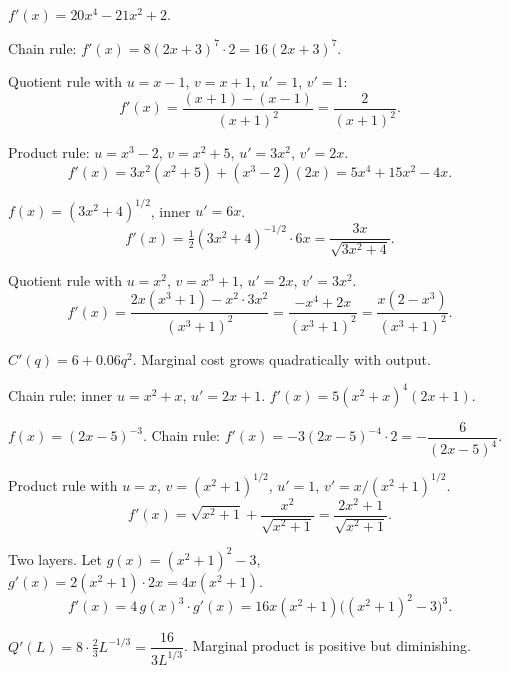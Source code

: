 \begin{solutions}
  \item $f'(x)=20x^{4}-21x^{2}+2$.

  \item Chain rule: $f'(x)=8(2x+3)^{7}\cdot 2=16(2x+3)^{7}$.

  \item Quotient rule with $u=x-1$, $v=x+1$, $u'=1$, $v'=1$:
        \[
          f'(x)=\frac{(x+1)-(x-1)}{(x+1)^{2}}=\frac{2}{(x+1)^{2}} .
        \]

  \item Product rule: $u=x^{3}-2$, $v=x^{2}+5$, $u'=3x^{2}$, $v'=2x$.
        \[
          f'(x)=3x^{2}(x^{2}+5)+(x^{3}-2)(2x)=5x^{4}+15x^{2}-4x .
        \]

  \item $f(x)=(3x^{2}+4)^{1/2}$, inner $u'=6x$.
        \[
          f'(x)=\tfrac12(3x^{2}+4)^{-1/2}\cdot 6x=\frac{3x}{\sqrt{3x^{2}+4}} .
        \]

  \item Quotient rule with $u=x^{2}$, $v=x^{3}+1$, $u'=2x$, $v'=3x^{2}$.
        \[
          f'(x)=\frac{2x(x^{3}+1)-x^{2}\cdot 3x^{2}}{(x^{3}+1)^{2}}
               =\frac{-x^{4}+2x}{(x^{3}+1)^{2}}
               =\frac{x(2-x^{3})}{(x^{3}+1)^{2}} .
        \]

  \item $C'(q)=6+0.06q^{2}$. Marginal cost grows quadratically with output.

  \item Chain rule: inner $u=x^{2}+x$, $u'=2x+1$.
        $f'(x)=5(x^{2}+x)^{4}(2x+1)$.

  \item $f(x)=(2x-5)^{-3}$. Chain rule: $f'(x)=-3(2x-5)^{-4}\cdot 2
        =-\dfrac{6}{(2x-5)^{4}}$.

  \item Product rule with $u=x$, $v=(x^{2}+1)^{1/2}$, $u'=1$,
        $v'=x/(x^{2}+1)^{1/2}$.
        \[
          f'(x)=\sqrt{x^{2}+1}+\frac{x^{2}}{\sqrt{x^{2}+1}}
               =\frac{2x^{2}+1}{\sqrt{x^{2}+1}} .
        \]

  \item Two layers. Let $g(x)=(x^{2}+1)^{2}-3$,
        $g'(x)=2(x^{2}+1)\cdot 2x=4x(x^{2}+1)$.
        \[
          f'(x)=4\,g(x)^{3}\cdot g'(x)
               =16x(x^{2}+1)\bigl((x^{2}+1)^{2}-3\bigr)^{3} .
        \]

  \item $Q'(L)=8\cdot\tfrac23L^{-1/3}=\dfrac{16}{3L^{1/3}}$. Marginal
        product is positive but diminishing.


\end{solutions}
